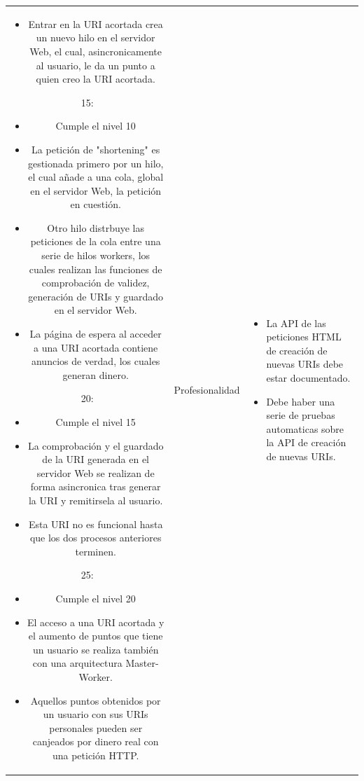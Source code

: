 \documentclass{article}
\begin{document}
\begin{table}[hbtp]
\begin{tabulary}{\textwidth}{ C L }
\begin{itemize}
        \item Entrar en la URI acortada crea un nuevo hilo en el servidor Web, el cual, asincronicamente al usuario, le da un punto a quien creo la URI acortada.
    \end{itemize} 
    15:
    \begin{itemize}
        \item Cumple el nivel 10
        
        \item La petición de "shortening" es gestionada primero por un hilo, el cual añade a una cola, global en el servidor Web, la petición en cuestión.
        
        \item Otro hilo distrbuye las peticiones de la cola entre una serie de hilos workers, los cuales realizan las funciones de comprobación de validez, generación de URIs y guardado en el servidor Web.
        
        \item La página de espera al acceder a una URI acortada contiene anuncios de verdad, los cuales generan dinero.
	\end{itemize} 
    20:
    \begin{itemize}
        \item Cumple el nivel 15
        
        \item La comprobación y el guardado de la URI generada en el servidor Web se realizan de forma asincronica tras generar la URI y remitirsela al usuario. 
        
        \item Esta URI no es funcional hasta que los dos procesos anteriores terminen.
	\end{itemize}
    25:
    \begin{itemize}
        \item Cumple el nivel 20
        
        \item El acceso a una URI acortada y el aumento de puntos que tiene un usuario se realiza también con una arquitectura Master-Worker.

        \item Aquellos puntos obtenidos por un usuario con sus URIs personales pueden ser canjeados por dinero real con una petición HTTP.
	\end{itemize} &

    Profesionalidad & 
    \begin{itemize}
        \item La API de las peticiones HTML de creación de nuevas URIs debe estar documentado.
	    \item Debe haber una serie de pruebas automaticas sobre la API de creación de nuevas URIs.
    \end{itemize}

    \end{tabulary}
\end{table}
\end{document}
